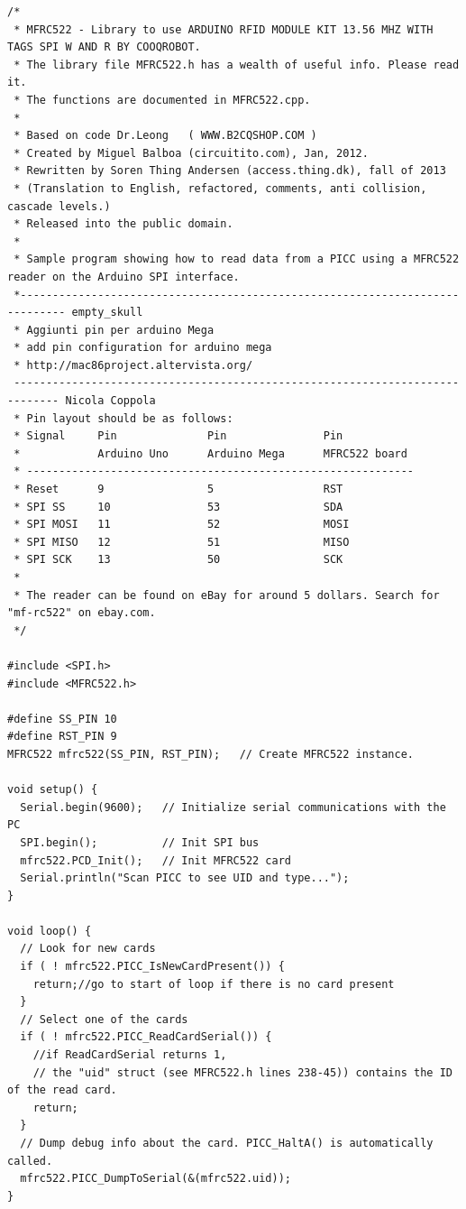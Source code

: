 \documentclass[a4paper, 11pt]{article}           %
\newcounter{Q}
\begin{document}
\begin{lstlisting}
/*
 * MFRC522 - Library to use ARDUINO RFID MODULE KIT 13.56 MHZ WITH TAGS SPI W AND R BY COOQROBOT.
 * The library file MFRC522.h has a wealth of useful info. Please read it.
 * The functions are documented in MFRC522.cpp.
 *
 * Based on code Dr.Leong   ( WWW.B2CQSHOP.COM )
 * Created by Miguel Balboa (circuitito.com), Jan, 2012.
 * Rewritten by Soren Thing Andersen (access.thing.dk), fall of 2013
 * (Translation to English, refactored, comments, anti collision, cascade levels.)
 * Released into the public domain.
 *
 * Sample program showing how to read data from a PICC using a MFRC522 reader on the Arduino SPI interface.
 *----------------------------------------------------------------------------- empty_skull
 * Aggiunti pin per arduino Mega
 * add pin configuration for arduino mega
 * http://mac86project.altervista.org/
 ----------------------------------------------------------------------------- Nicola Coppola
 * Pin layout should be as follows:
 * Signal     Pin              Pin               Pin
 *            Arduino Uno      Arduino Mega      MFRC522 board
 * ------------------------------------------------------------
 * Reset      9                5                 RST
 * SPI SS     10               53                SDA
 * SPI MOSI   11               52                MOSI
 * SPI MISO   12               51                MISO
 * SPI SCK    13               50                SCK
 *
 * The reader can be found on eBay for around 5 dollars. Search for "mf-rc522" on ebay.com.
 */

#include <SPI.h>
#include <MFRC522.h>

#define SS_PIN 10
#define RST_PIN 9
MFRC522 mfrc522(SS_PIN, RST_PIN);	// Create MFRC522 instance.

void setup() {
  Serial.begin(9600);	// Initialize serial communications with the PC
  SPI.begin();			// Init SPI bus
  mfrc522.PCD_Init();	// Init MFRC522 card
  Serial.println("Scan PICC to see UID and type...");
}

void loop() {
  // Look for new cards
  if ( ! mfrc522.PICC_IsNewCardPresent()) {
    return;//go to start of loop if there is no card present
  }
  // Select one of the cards
  if ( ! mfrc522.PICC_ReadCardSerial()) {
    //if ReadCardSerial returns 1,
    // the "uid" struct (see MFRC522.h lines 238-45)) contains the ID of the read card.
    return;
  }
  // Dump debug info about the card. PICC_HaltA() is automatically called.
  mfrc522.PICC_DumpToSerial(&(mfrc522.uid));
}
\end{lstlisting}
\end{document}
